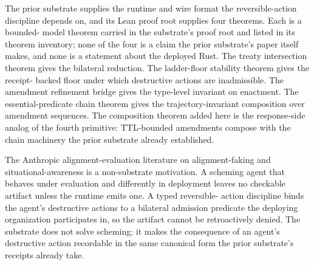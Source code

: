 The prior substrate \cite{programmableSovereigntyAnonymous} supplies
the runtime and wire format the reversible-action discipline depends
on, and its Lean proof root supplies four theorems. Each is a bounded-
model theorem carried in the substrate's proof root and listed in its
theorem inventory; none of the four is a claim the prior substrate's
paper itself makes, and none is a statement about the deployed Rust.
The treaty intersection theorem
 gives the bilateral
reduction. The ladder-floor stability theorem
 gives the receipt-
backed floor under which destructive actions are inadmissible. The
amendment refinement bridge
 gives the type-level
invariant on enactment. The essential-predicate chain theorem
 gives the trajectory-invariant
composition over amendment sequences. The composition theorem added
here is the response-side analog of the fourth primitive: TTL-bounded
amendments compose with the chain machinery the prior substrate already
established.

The Anthropic alignment-evaluation literature on alignment-faking and
situational-awareness is a non-substrate motivation. A scheming agent
that behaves under evaluation and differently in deployment leaves no
checkable artifact unless the runtime emits one. A typed reversible-
action discipline binds the agent's destructive actions to a bilateral
admission predicate the deploying organization participates in, so the
artifact cannot be retroactively denied. The substrate does not solve
scheming; it makes the consequence of an agent's destructive action
recordable in the same canonical form the prior substrate's receipts
\cite{programmableSovereigntyAnonymous} already take.
